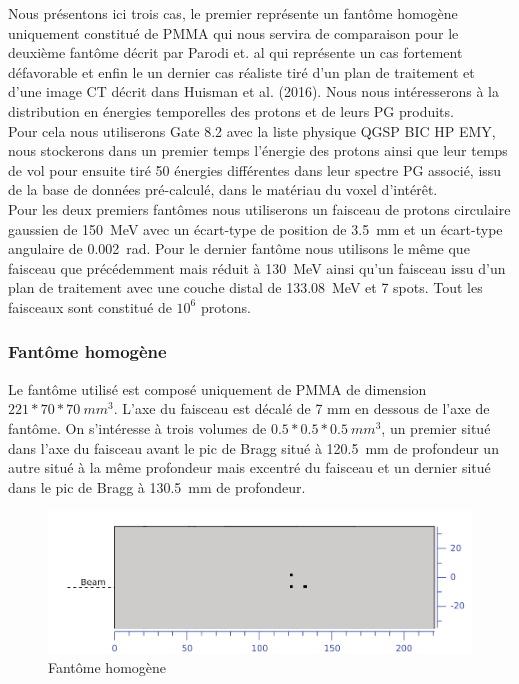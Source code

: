 \documentclass[11pt,a4paper,oldfontcommands]{memoir}
\begin{document}
Nous présentons ici trois cas, le premier représente un fantôme homogène uniquement constitué de PMMA qui nous servira de comparaison pour le deuxième fantôme décrit par Parodi et. al \cite{1487723} qui représente un cas fortement défavorable et enfin le un dernier cas réaliste tiré d'un plan de traitement et d'une image CT décrit dans Huisman et al. (2016). Nous nous intéresserons à la distribution en énergies temporelles des protons et de leurs PG produits.\\ Pour cela nous utiliserons Gate 8.2 avec la liste physique QGSP BIC HP EMY, nous stockerons dans un premier temps l'énergie des protons ainsi que leur temps de vol pour ensuite tiré 50 énergies différentes dans leur spectre PG associé, issu de la base de données pré-calculé, dans le matériau du voxel d'intérêt.\\
Pour les deux premiers fantômes nous utiliserons un faisceau de protons circulaire gaussien de 150~MeV avec un écart-type de position de 3.5~mm et un écart-type angulaire de 0.002~rad. Pour le dernier fantôme nous utilisons le même que faisceau que précédemment mais réduit à 130~MeV ainsi qu'un faisceau issu d'un plan de traitement avec une couche distal de 133.08~MeV et 7 spots. Tout les faisceaux sont constitué de $10^6$ protons. 

\subsubsection{Fantôme homogène}

Le fantôme utilisé est composé uniquement de PMMA de dimension $221*70*70~mm^3$. L'axe du faisceau est décalé de 7 mm en dessous de l'axe de fantôme. On s'intéresse à trois volumes de $0.5*0.5*0.5~mm^3$, un premier situé dans l'axe du faisceau avant le pic de Bragg situé à 120.5~mm de profondeur un autre situé à la même profondeur mais excentré du faisceau et un dernier situé dans le pic de Bragg à 130.5~mm de profondeur.\\
\begin{figure}[h!]
    \centering
    \includegraphics[scale = 0.3]{homo/homofant.png}
    \caption{Fantôme homogène}
    \label{fant homo}
\end{figure}{}
\end{document}
